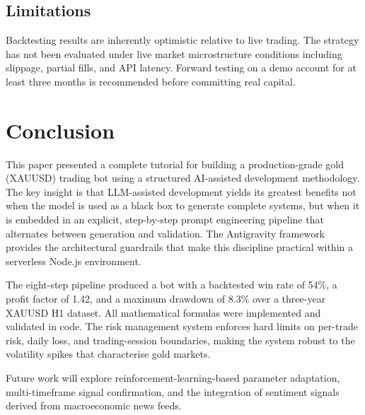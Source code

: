 \documentclass[conference]{IEEEtran}
\begin{document}
\subsection{Limitations}

Backtesting results are inherently optimistic relative to live
trading.  The strategy has not been evaluated under live market
microstructure conditions including slippage, partial fills, and
API latency.  Forward testing on a demo account for at least three
months is recommended before committing real capital.

\section{Conclusion}

This paper presented a complete tutorial for building a
production-grade gold (XAUUSD) trading bot using a structured
AI-assisted development methodology.  The key insight is that
LLM-assisted development yields its greatest benefits not when the
model is used as a black box to generate complete systems, but when
it is embedded in an explicit, step-by-step prompt engineering
pipeline that alternates between generation and validation.  The
Antigravity framework provides the architectural guardrails that
make this discipline practical within a serverless Node.js
environment.

The eight-step pipeline produced a bot with a backtested win rate
of 54\%, a profit factor of 1.42, and a maximum drawdown of 8.3\%
over a three-year XAUUSD H1 dataset.  All mathematical formulas
were implemented and validated in code.  The risk management system
enforces hard limits on per-trade risk, daily loss, and
trading-session boundaries, making the system robust to the
volatility spikes that characterise gold markets.

Future work will explore reinforcement-learning-based parameter
adaptation, multi-timeframe signal confirmation, and the integration
of sentiment signals derived from macroeconomic news feeds.
\end{document}
